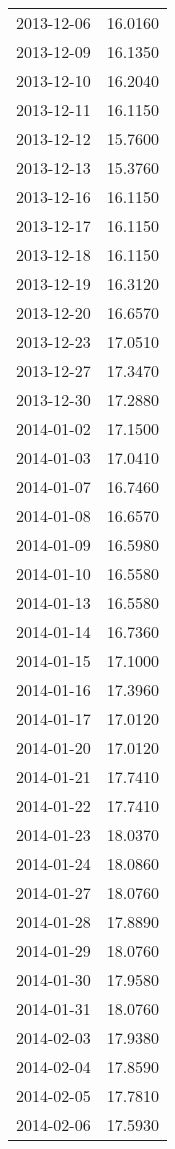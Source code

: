 \begin{tabular}{lr}
2013-12-06 &     16.0160 \\
2013-12-09 &     16.1350 \\
2013-12-10 &     16.2040 \\
2013-12-11 &     16.1150 \\
2013-12-12 &     15.7600 \\
2013-12-13 &     15.3760 \\
2013-12-16 &     16.1150 \\
2013-12-17 &     16.1150 \\
2013-12-18 &     16.1150 \\
2013-12-19 &     16.3120 \\
2013-12-20 &     16.6570 \\
2013-12-23 &     17.0510 \\
2013-12-27 &     17.3470 \\
2013-12-30 &     17.2880 \\
2014-01-02 &     17.1500 \\
2014-01-03 &     17.0410 \\
2014-01-07 &     16.7460 \\
2014-01-08 &     16.6570 \\
2014-01-09 &     16.5980 \\
2014-01-10 &     16.5580 \\
2014-01-13 &     16.5580 \\
2014-01-14 &     16.7360 \\
2014-01-15 &     17.1000 \\
2014-01-16 &     17.3960 \\
2014-01-17 &     17.0120 \\
2014-01-20 &     17.0120 \\
2014-01-21 &     17.7410 \\
2014-01-22 &     17.7410 \\
2014-01-23 &     18.0370 \\
2014-01-24 &     18.0860 \\
2014-01-27 &     18.0760 \\
2014-01-28 &     17.8890 \\
2014-01-29 &     18.0760 \\
2014-01-30 &     17.9580 \\
2014-01-31 &     18.0760 \\
2014-02-03 &     17.9380 \\
2014-02-04 &     17.8590 \\
2014-02-05 &     17.7810 \\
2014-02-06 &     17.5930 \\

\end{tabular}
